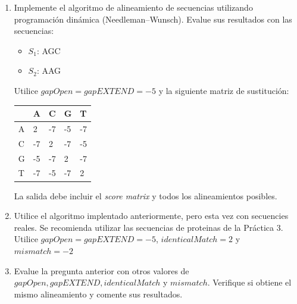 \documentclass{article}
\begin{document}
	\begin{enumerate}
		
		\item 
		
		 Implemente el algoritmo de alineamiento de secuencias utilizando programación dinámica (Needleman–Wunsch). Evalue sus resultados con las secuencias:
				\begin{itemize}
					\item $S_1$: AGC
					\item $S_2$: AAG
				\end{itemize}
			
		Utilice $gapOpen = gapEXTEND = -5$ y la siguiente matriz de sustitución:
		
		\begin{table}[hbt!]
			\centering
			\begin{tabular}{l|llll}
				\textbf{} & A  & C  & G  & T  \\
				\hline
				A         & 2  & -7 & -5 & -7 \\
				C         & -7 & 2  & -7 & -5 \\
				G         & -5 & -7 & 2  & -7 \\
				T         & -7 & -5 & -7 & 2 
			\end{tabular}
		\end{table}
	
		La salida debe incluir el \textit{score matrix} y todos los alineamientos posibles.
			
		\item 
		
		Utilice el algoritmo implentado anteriormente, pero esta vez con secuencies reales. Se recomienda utilizar las secuencias de proteinas de la Práctica 3. Utilice $gapOpen = gapEXTEND = -5$, $identicalMatch = 2$ y $mismatch = -2$
		
		\item 
		Evalue la pregunta anterior con otros valores de $gapOpen, gapEXTEND, identicalMatch$ y $mismatch$. Verifique si obtiene el mismo alineamiento y comente sus resultados.
		

	

	\end{enumerate}
	
	
\end{document}
